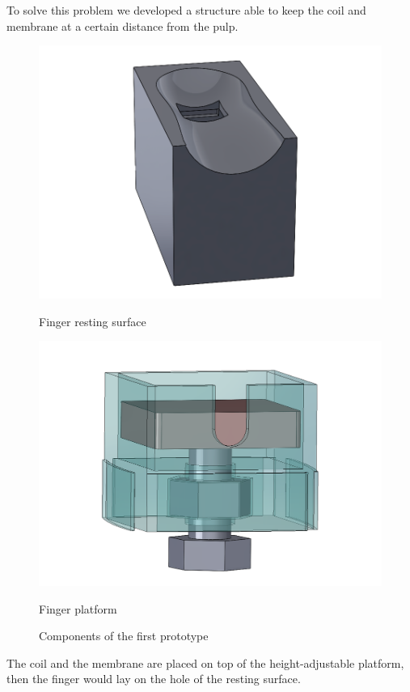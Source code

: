 To solve this problem we developed a structure able to keep the coil and membrane at a certain distance from the pulp.
\begin{figure}[H]
    \centering
    \begin{subcaptiongroup}
      \centering
      \parbox[b]{0.2\textwidth}{
        \centering
        \includegraphics[width = 0.9\linewidth]{Figures/finger_holder.png}
        \caption{Finger resting surface}
      }
      \parbox[b]{0.2\textwidth}{
        \centering
        \includegraphics[width = 0.9\linewidth]{Figures/adj_platform.png}
        \caption{Finger platform}
      }
    \end{subcaptiongroup}
    \caption{Components of the first prototype}
\end{figure}
The coil and the membrane are placed on top of the height-adjustable platform, then the finger would lay on the hole of the resting surface.

